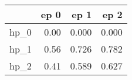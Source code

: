 \begin{tabular}{lrrr}
\toprule
{} &  ep 0 &   ep 1 &   ep 2 \\
\midrule
hp\_0 &  0.00 &  0.000 &  0.000 \\
hp\_1 &  0.56 &  0.726 &  0.782 \\
hp\_2 &  0.41 &  0.589 &  0.627 \\
\bottomrule
\end{tabular}
